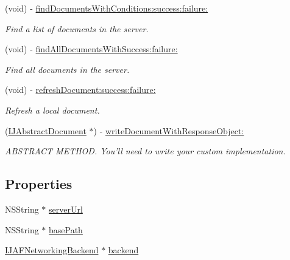 \begin{DoxyCompactItemize}
(void) -\/ \hyperlink{interface_i_j_abstract_repository_a892ede1f469ee2112a67c79e6139071f}{find\+Documents\+With\+Conditions\+:success\+:failure\+:}
\begin{DoxyCompactList}\small\item\em Find a list of documents in the server. \end{DoxyCompactList}\item 
(void) -\/ \hyperlink{interface_i_j_abstract_repository_a719a18f043952f383d27a9d62e0c8ace}{find\+All\+Documents\+With\+Success\+:failure\+:}
\begin{DoxyCompactList}\small\item\em Find all documents in the server. \end{DoxyCompactList}\item 
(void) -\/ \hyperlink{interface_i_j_abstract_repository_a1235a257e5e040cb665ad9607b9a8e42}{refresh\+Document\+:success\+:failure\+:}
\begin{DoxyCompactList}\small\item\em Refresh a local document. \end{DoxyCompactList}\item 
(\hyperlink{interface_i_j_abstract_document}{I\+J\+Abstract\+Document} $\ast$) -\/ \hyperlink{interface_i_j_abstract_repository_a549ff3d651249e23fce04b4ddf34f7da}{write\+Document\+With\+Response\+Object\+:}
\begin{DoxyCompactList}\small\item\em A\+B\+S\+T\+R\+A\+C\+T M\+E\+T\+H\+O\+D. You'll need to write your custom implementation. \end{DoxyCompactList}\end{DoxyCompactItemize}
\subsection*{Properties}
\begin{DoxyCompactItemize}
\item 
N\+S\+String $\ast$ \hyperlink{interface_i_j_abstract_repository_acd6b170c909e14111c45205790afba4e}{server\+Url}
\item 
N\+S\+String $\ast$ \hyperlink{interface_i_j_abstract_repository_ac13521df8d9bce73b5cf3a487e7f6a06}{base\+Path}
\item 
\hyperlink{interface_i_j_a_f_networking_backend}{I\+J\+A\+F\+Networking\+Backend} $\ast$ \hyperlink{interface_i_j_abstract_repository_a5c1b814ca5af1f13cf8f1ed03f790b3f}{backend}
\end{DoxyCompactItemize}


